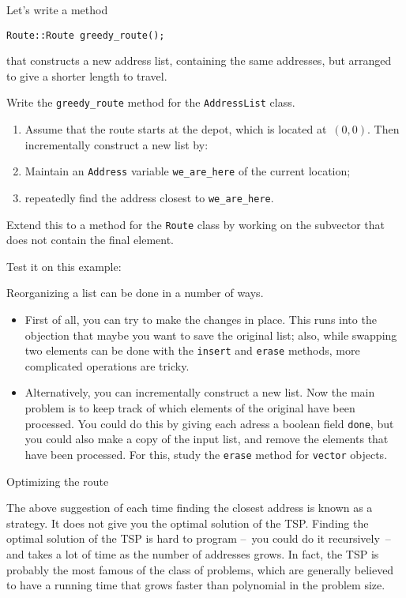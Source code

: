Let's write a method
\begin{lstlisting}
Route::Route greedy_route();
\end{lstlisting}
that constructs a new address list, containing the same addresses, but
arranged to give a shorter length to travel.

\begin{exercise}
  Write the \lstinline{greedy_route} method for the
  \lstinline{AddressList} class.
  \begin{enumerate}
  \item Assume that the route starts at the depot, which is located
    at~$(0,0)$. Then  incrementally construct a new list by:
    \item Maintain an \lstinline{Address} variable
      \lstinline{we_are_here} of the current location;
    \item repeatedly find the address closest to \lstinline{we_are_here}.
  \end{enumerate}
  Extend this to a method for the
  \lstinline{Route} class by working on the subvector that does not
  contain the final element.

  Test it on this example:
\end{exercise}

Reorganizing a list can be done in a number of ways.
\begin{itemize}
\item First of all, you can try to make the changes in place. This
  runs into the objection that maybe you want to save the original
  list; also, while swapping two elements can be done with the
  \lstinline{insert} and \lstinline{erase} methods, more complicated
  operations are tricky.
\item Alternatively, you can incrementally construct a new list. Now
  the main problem is to keep track of which elements of the original
  have been processed. You could do this by giving each adress a
  boolean field \lstinline{done}, but you could also make a copy of
  the input list, and remove the elements that have been processed.
  For this, study the \lstinline{erase} method for \lstinline{vector} objects.
\end{itemize}

 {Optimizing the route}

The above suggestion of each time finding the closest address is known
as a  strategy. It does not give you
the optimal solution of the \ac{TSP}. Finding the optimal solution of
the \ac{TSP} is hard to program --~you could do it recursively~-- and
takes a lot of time as the number of addresses grows. In fact, the
\ac{TSP} is probably the most famous of the class of
 problems, which are generally believed to have a
running time that grows faster than polynomial in the problem size.

